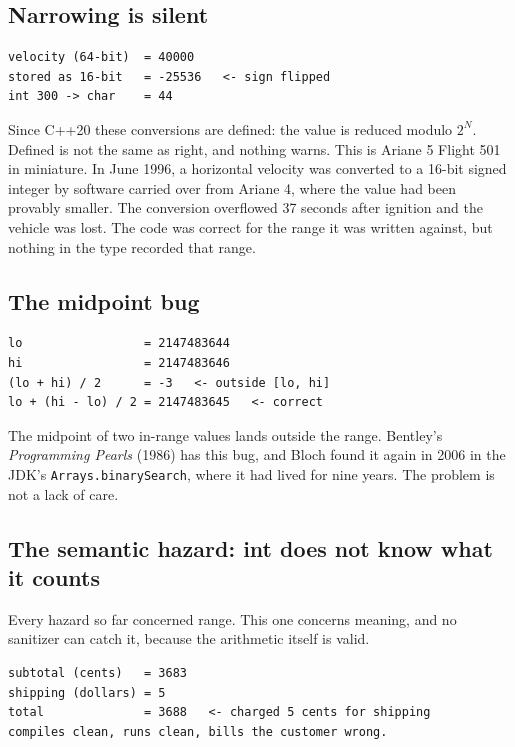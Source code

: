\documentclass[11pt,a4paper]{article}
\newcommand{\code}[1]{\texttt{\small #1}}
\begin{document}
\subsection{Narrowing is silent}\label{sec:narrowing}


\begin{lstlisting}[style=term]
velocity (64-bit)  = 40000
stored as 16-bit   = -25536   <- sign flipped
int 300 -> char    = 44
\end{lstlisting}

\noindent
Since C++20 these conversions are defined: the value is reduced modulo $2^N$.
Defined is not the same as right, and nothing warns. This is Ariane 5 Flight 501 in miniature. In June 1996, a horizontal velocity
was converted to a 16-bit signed integer by software carried over from Ariane
4, where the value had been provably smaller. The conversion overflowed 37
seconds after ignition and the vehicle was lost. The code was correct for the
range it was written against, but nothing in the type recorded that range.

\subsection{The midpoint bug}


\begin{lstlisting}[style=term]
lo                 = 2147483644
hi                 = 2147483646
(lo + hi) / 2      = -3   <- outside [lo, hi]
lo + (hi - lo) / 2 = 2147483645   <- correct
\end{lstlisting}

\noindent
The midpoint of two in-range values lands outside the range. Bentley's
\emph{Programming Pearls} (1986) has this bug, and Bloch found it again in 2006
in the JDK's \code{Arrays.binarySearch}, where it had lived for nine years. The
problem is not a lack of care.

\subsection{The semantic hazard: int does not know what it counts}\label{sec:semantic}

Every hazard so far concerned range. This one concerns meaning, and no
sanitizer can catch it, because the arithmetic itself is valid.


\begin{lstlisting}[style=term]
subtotal (cents)   = 3683
shipping (dollars) = 5
total              = 3688   <- charged 5 cents for shipping
compiles clean, runs clean, bills the customer wrong.
\end{lstlisting}
\end{document}
